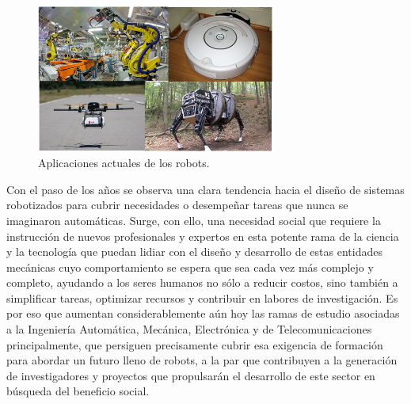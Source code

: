 \begin{figure}[!hbtp]  \centering\noindent
    \includegraphics[width=0.7\textwidth]{figures/robots.png}
    \caption{Aplicaciones actuales de los robots.}
    \label{robots}
\end{figure}

Con el paso de los años se observa una clara tendencia hacia el diseño de sistemas robotizados para cubrir necesidades o desempeñar tareas que nunca se imaginaron automáticas. Surge, con ello, una necesidad social que requiere la instrucción de nuevos profesionales y expertos en esta potente rama de la ciencia y la tecnología que puedan lidiar con el diseño y desarrollo de estas entidades mecánicas cuyo comportamiento se espera que sea cada vez más complejo y completo, ayudando a los seres humanos no sólo a reducir costos, sino también a simplificar tareas, optimizar recursos y contribuir en labores de investigación. Es por eso que aumentan considerablemente aún hoy las ramas de estudio asociadas a la Ingeniería Automática, Mecánica, Electrónica y de Telecomunicaciones principalmente, que persiguen precisamente cubrir esa exigencia de formación para abordar un futuro lleno de robots, a la par que contribuyen a la generación de investigadores y proyectos que propulsarán el desarrollo de este sector en búsqueda del beneficio social. 


